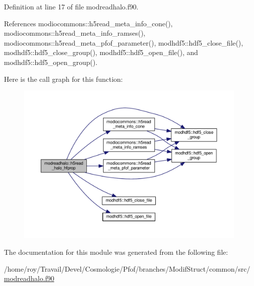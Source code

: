 Definition at line 17 of file modreadhalo.\-f90.



References modiocommons\-::h5read\-\_\-meta\-\_\-info\-\_\-cone(), modiocommons\-::h5read\-\_\-meta\-\_\-info\-\_\-ramses(), modiocommons\-::h5read\-\_\-meta\-\_\-pfof\-\_\-parameter(), modhdf5\-::hdf5\-\_\-close\-\_\-file(), modhdf5\-::hdf5\-\_\-close\-\_\-group(), modhdf5\-::hdf5\-\_\-open\-\_\-file(), and modhdf5\-::hdf5\-\_\-open\-\_\-group().



Here is the call graph for this function\-:\nopagebreak
\begin{figure}[H]
\begin{center}
\leavevmode
\includegraphics[width=350pt]{classmodreadhalo_a1a011c42c3cd4dbb53fd4a10342a5a09_cgraph}
\end{center}
\end{figure}




The documentation for this module was generated from the following file\-:\begin{DoxyCompactItemize}
\item 
/home/roy/\-Travail/\-Devel/\-Cosmologie/\-Pfof/branches/\-Modif\-Struct/common/src/\hyperlink{modreadhalo_8f90}{modreadhalo.\-f90}\end{DoxyCompactItemize}
